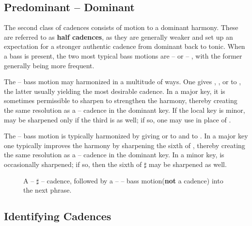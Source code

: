 \subsection{Predominant -- Dominant}

The second class of cadences consists of motion to a dominant harmony. These are referred to as \textbf{half cadences}, as they are generally weaker and set up an expectation for a stronger authentic cadence from dominant back to tonic. When a bass is present, the two most typical bass motions are  --  or  -- , with the former generally being more frequent.

The  --  bass motion may harmonized in a multitude of ways. One gives , , or  to , the latter usually yielding the most desirable cadence. In a major key, it is sometimes permissible to sharpen  to strengthen the harmony, thereby creating the same resolution as a  --  cadence in the dominant key. If the local key is minor,  may be sharpened only if the third is as well; if so, one may use  in place of .

The  --  bass motion is typically harmonized by giving  or  to  and  to . In a major key one typically improves the harmony by sharpening the sixth of , thereby creating the same resolution as a  --  cadence in the dominant key. In a minor key,  is occasionally sharpened; if so, then the sixth of $\sharp$ may be sharpened as well.

\begin{figure}[h]
\centering
{}
\caption{A  -- $\sharp$ --  cadence, followed by a  --  --  bass motion(\textbf{not} a cadence) into the next phrase. }
\end{figure}


\subsection{Identifying Cadences}

